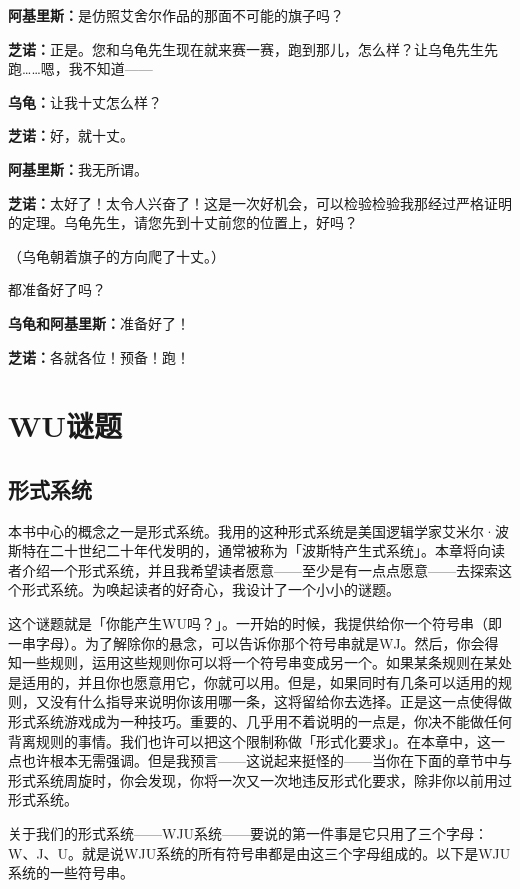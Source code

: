 \documentclass[
  12pt,
  twoside,
  openright,
  oldfontcommands,
]{memoir}
\newcommand{\dialogname}[1]{{\heifamily\bfseries #1}}
\begin{document}
\dialogname{阿基里斯：}是仿照艾舍尔作品的那面不可能的旗子吗？

\dialogname{芝诺：}正是。您和乌龟先生现在就来赛一赛，跑到那儿，怎么样？让乌龟先生先跑\ldots\ldots 嗯，我不知道------

\dialogname{乌龟：}让我十丈怎么样？

\dialogname{芝诺：}好，就十丈。

\dialogname{阿基里斯：}我无所谓。

\dialogname{芝诺：}太好了！太令人兴奋了！这是一次好机会，可以检验检验我那经过严格证明的定理。乌龟先生，请您先到十丈前您的位置上，好吗？

（乌龟朝着旗子的方向爬了十丈。）

都准备好了吗？

\dialogname{乌龟和阿基里斯：}准备好了！

\dialogname{芝诺：}各就各位！预备！跑！

\label{Chapter01.xhtml}{}

\chapter{WU谜题}

\section{形式系统}

本书中心的概念之一是形式系统。我用的这种形式系统是美国逻辑学家艾米尔·波斯特在二十世纪二十年代发明的，通常被称为「波斯特产生式系统」。本章将向读者介绍一个形式系统，并且我希望读者愿意------至少是有一点点愿意------去探索这个形式系统。为唤起读者的好奇心，我设计了一个小小的谜题。

这个谜题就是「你能产生WU吗？」。一开始的时候，我提供给你一个符号串（即一串字母）。为了解除你的悬念，可以告诉你那个符号串就是WJ。然后，你会得知一些规则，运用这些规则你可以将一个符号串变成另一个。如果某条规则在某处是适用的，并且你也愿意用它，你就可以用。但是，如果同时有几条可以适用的规则，又没有什么指导来说明你该用哪一条，这将留给你去选择。正是这一点使得做形式系统游戏成为一种技巧。重要的、几乎用不着说明的一点是，你决不能做任何背离规则的事情。我们也许可以把这个限制称做「形式化要求」。在本章中，这一点也许根本无需强调。但是我预言------这说起来挺怪的------当你在下面的章节中与形式系统周旋时，你会发现，你将一次又一次地违反形式化要求，除非你以前用过形式系统。

关于我们的形式系统------WJU系统------要说的第一件事是它只用了三个字母：W、J、U。就是说WJU系统的所有符号串都是由这三个字母组成的。以下是WJU系统的一些符号串。
\end{document}

